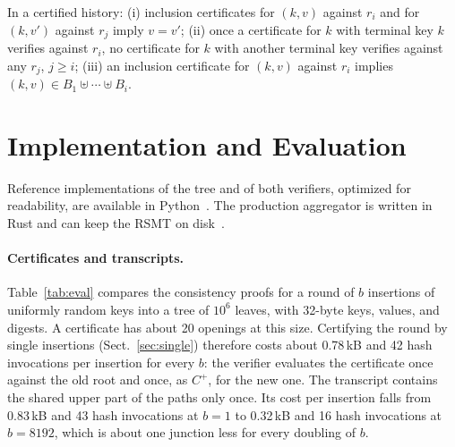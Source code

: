 \documentclass[runningheads]{llncs}
\begin{document}
\begin{corollary}[Unicity]\label{cor:history}
In a certified history: (i) inclusion certificates for $(k,v)$ against $r_i$ and for $(k,v')$ against $r_j$ imply $v = v'$; (ii) once a certificate for $k$ with terminal key $k$ verifies against $r_i$, no certificate for $k$ with another terminal key verifies against any $r_j$, $j \ge i$; (iii) an inclusion certificate for $(k,v)$ against $r_i$ implies $(k,v) \in B_1 \uplus \cdots \uplus B_i$.
\end{corollary}

\section{Implementation and Evaluation}\label{sec:impl}

Reference implementations of the tree and of both verifiers, optimized for readability, are available in Python~\cite{ndsmtexp}. The production aggregator is written in Rust and can keep the RSMT on disk~\cite{rugregator}.

\paragraph{Certificates and transcripts.}
Table~\ref{tab:eval} compares the consistency proofs for a round of $b$ insertions of uniformly random keys into a tree of $10^6$ leaves, with 32-byte keys, values, and digests. A certificate has about 20 openings at this size. Certifying the round by single insertions (Sect.~\ref{sec:single}) therefore costs about 0.78\,kB and 42 hash invocations per insertion for every $b$: the verifier evaluates the certificate once against the old root and once, as $C^{+}$, for the new one. The transcript contains the shared upper part of the paths only once. Its cost per insertion falls from 0.83\,kB and 43 hash invocations at $b = 1$ to 0.32\,kB and 16 hash invocations at $b = 8192$, which is about one junction less for every doubling of $b$.
\end{document}
